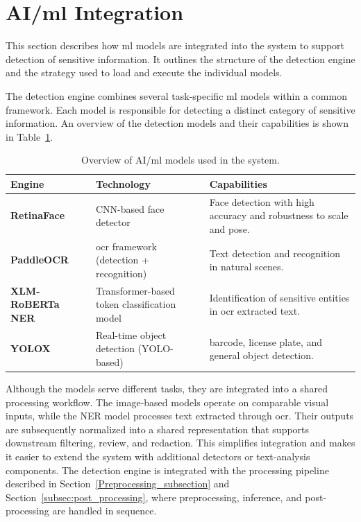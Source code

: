 \section{AI/\acrshort{ml} Integration}
\label{ai_ml_integration}
This section describes how \acrshort{ml} models are integrated into the system to support detection of sensitive information. It outlines the structure of the detection engine and the strategy used to load and execute the individual models.


The detection engine combines several task-specific \acrshort{ml} models within a common framework. Each model is responsible for detecting a distinct category of sensitive information. An overview of the detection models and their capabilities is shown in Table~\ref{tab:detection_models}.

\begin{table}[H]
\centering
\small
\begin{tabularx}{\textwidth}{|p{2.7cm}|p{4.4cm}|X|}
\hline
\textbf{Engine} & \textbf{Technology} & \textbf{Capabilities} \\ \hline

\textbf{RetinaFace} & 
CNN-based face detector & 
Face detection with high accuracy and robustness to scale and pose. \\ \hline

\textbf{PaddleOCR} & 
\acrshort{ocr} framework (detection + recognition) & 
Text detection and recognition in natural scenes. \\ \hline

\textbf{XLM-RoBERTa NER} & 
Transformer-based token classification model & 
Identification of sensitive entities in \acrshort{ocr} extracted text. \\ \hline

\textbf{YOLOX} & 
Real-time \gls{object detection} (YOLO-based) & 
\gls{barcode}, license plate, and general \gls{object detection}. \\ \hline

\end{tabularx}
\caption{Overview of AI/\acrshort{ml} models used in the system.}
\label{tab:detection_models}
\end{table}

Although the models serve different tasks, they are integrated into a shared processing workflow. The image-based models operate on comparable visual inputs, while the NER model processes text extracted through \acrshort{ocr}. Their outputs are subsequently normalized into a shared representation that supports downstream filtering, review, and redaction. This simplifies integration and makes it easier to extend the system with additional detectors or text-analysis components. The detection engine is integrated with the processing pipeline described in Section~\ref{Preprocessing_subsection} and Section~\ref{subsec:post_processing}, where preprocessing, \gls{inference}, and post-processing are handled in sequence.

